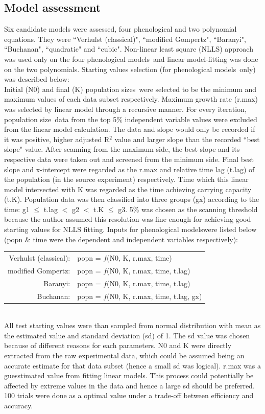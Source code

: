 \documentclass[a4paper, 11pt]{article}
\newcommand{\pms}{phenological models}
\newcommand{\fve}{Verhulst (classical)}
\newcommand{\fgo}{modified Gompertz}
\newcommand{\fba}{Baranyi}
\newcommand{\fbu}{Buchanan}
\newcommand{\fqu}{quadratic}
\newcommand{\fcu}{cubic}
\newcommand{\pop}{population size}
\newcommand{\pps}{population sizes}
\begin{document}
	\subsection*{Model assessment}
	Six candidate models were assessed, four phenological and two polynomial equations.  They were ``\fve"\autocite{mckendrick1912xlv}, ``\fgo"\autocite{GIL200689}, ``\fba"\autocite{baranyi1993modeling}, ``\fbu"\autocite{buchanan1993differentiation}, ``\fqu" and ``\fcu". Non-linear least square (NLLS) approach was used only on the four \pms\ and linear model-fitting was done on the two polynomials.  Starting values selection (for \pms\ only) was described below:\\
	Initial (N0) and final (K) \pps\ were selected to be the minimum and maximum values of each data subset respectively.  Maximum growth rate (r.max) was selected by linear model through a recursive manner.  For every iteration, \pop\ data from the top 5\% independent variable values were excluded from the linear model calculation.  The data and slope would only be recorded if it was positive, higher adjusted R$^{2}$ value and larger slope than the recorded ``best slope" value.  After scanning from the maximum side, the best slope and its respective data were taken out and screened from the minimum side.  Final best slope and x-intercept were regarded as the r.max and relative time lag (t.lag) of the population (in the source experiment) respectively.  Time which this linear model intersected with K was regarded as the time achieving carrying capacity (t.K).  Population data was then classified into three groups (gx) according to the time: g1 $\leq$ t.lag $<$ g2 $<$ t.K $\leq$ g3.  5\% was chosen as the scanning threshold because the author assumed this resolution was fine enough for achieving good starting values for NLLS fitting.  Inputs for \pms were listed below (popn \& time were the dependent and independent variables respectively):\\
	\begin{tabular}{rl}
		\fve: & popn = $f$(N0, K, r.max, time)\\
		\fgo: & popn = $f$(N0, K, r.max, time, t.lag)\\
		\fba: & popn = $f$(N0, K, r.max, time, t.lag)\\
		\fbu: & popn = $f$(N0, K, r.max, time, t.lag, gx)
	\end{tabular}\\
	
	All test starting values were than sampled from normal distribution with mean as the estimated value and standard deviation (sd) of 1.  The sd value was chosen because of different reasons for each parameters.  N0 and K were directly extracted from the raw experimental data, which could be assumed being an accurate estimate for that data subset (hence a small sd was logical). r.max was a guesstimated value from fitting linear models.  This process could potentially be affected by extreme values in the data and hence a large sd should be preferred.  100 trials were done as a optimal value under a trade-off between efficiency and accuracy.\\
	
\end{document}
